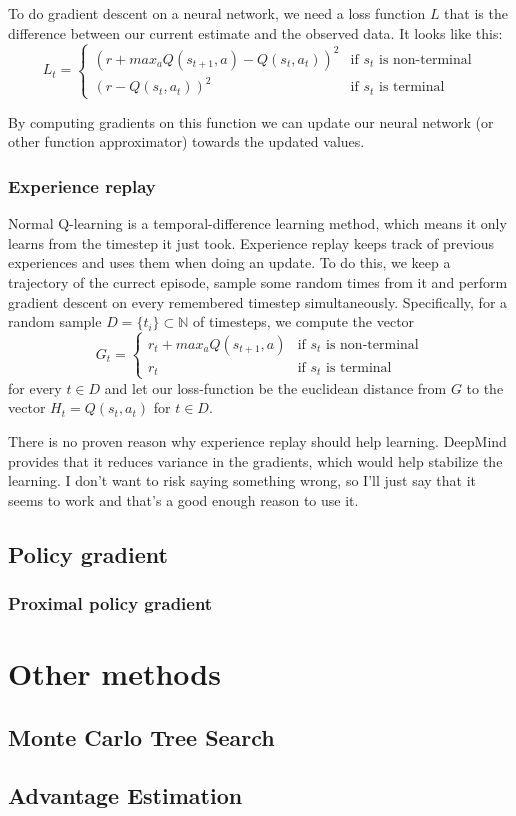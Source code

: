 \documentclass{article}
\theoremstyle{changedot}
\theoremstyle{changedotbreak}
\theoremstyle{nonumberplain}
\begin{document}
To do gradient descent on a neural network, we need a loss function $L$ that is the difference between our current estimate and the observed data. It looks like this:
\[L_{t} = \begin{cases}
    \left( r + max_{a} Q(s_{t+1}, a) - Q(s_{t}, a_{t}) \right)^{2} & \text{if $s_{t}$ is non-terminal} \\
    (r - Q(s_{t}, a_{t}))^{2} & \text{if $s_{t}$ is terminal}
  \end{cases}\]

By computing gradients on this function we can update our neural network (or other function approximator) towards the updated values.

\subsubsection{Experience replay}
Normal Q-learning is a temporal-difference learning method, which means it only learns from the timestep it just took. Experience replay keeps track of previous experiences and uses them when doing an update. To do this, we keep a trajectory of the currect episode, sample some random times from it and perform gradient descent on every remembered timestep simultaneously. Specifically, for a random sample $D = \{t_{i}\} \subset \mathbb N$ of timesteps, we compute the vector
\[G_{t} =  \begin{cases}
    r_{t} + max_{a} Q(s_{t+1}, a) & \text{if $s_{t}$ is non-terminal} \\
    r_{t} & \text{if $s_{t}$ is terminal}
  \end{cases} \]
for every $t \in D$ and let our loss-function be the euclidean distance from $G$ to the vector $H_{t} = Q(s_{t}, a_{t})$ for $t \in D$.

There is no proven reason why experience replay should help learning. DeepMind provides that it reduces variance in the gradients, which would help stabilize the learning. I don't want to risk saying something wrong, so I'll just say that it seems to work and that's a good enough reason to use it.


\subsection{Policy gradient}

\subsubsection{Proximal policy gradient}

\section{Other methods}

\subsection{Monte Carlo Tree Search}

\subsection{Advantage Estimation}




\end{document}
